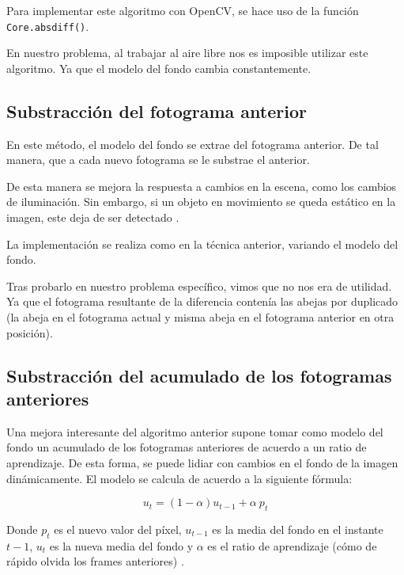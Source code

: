 Para implementar este algoritmo con OpenCV, se hace uso de la función
\texttt{Core.absdiff()}.

En nuestro problema, al trabajar al aire libre nos es imposible utilizar
este algoritmo. Ya que el modelo del fondo cambia constantemente.

\subsection{Substracción del fotograma anterior}\label{substraccion-del-fotograma-anterior}

En este método, el modelo del fondo se extrae del fotograma anterior. De
tal manera, que a cada nuevo fotograma se le substrae el anterior.

De esta manera se mejora la respuesta a cambios en la escena, como los
cambios de iluminación. Sin embargo, si un objeto en movimiento se queda
estático en la imagen, este deja de ser detectado
\citep{book:opencv_java}.

La implementación se realiza como en la técnica anterior, variando el
modelo del fondo.

Tras probarlo en nuestro problema específico, vimos que no nos era de
utilidad. Ya que el fotograma resultante de la diferencia contenía las
abejas por duplicado (la abeja en el fotograma actual y misma abeja en
el fotograma anterior en otra posición).

\subsection{Substracción del acumulado de los fotogramas anteriores}\label{substraccion-del-acumulado-de-los-fotogramas-anteriores}

Una mejora interesante del algoritmo anterior supone tomar como modelo
del fondo un acumulado de los fotogramas anteriores de acuerdo a un
ratio de aprendizaje. De esta forma, se puede lidiar con cambios en el
fondo de la imagen dinámicamente. El modelo se calcula de acuerdo a la
siguiente fórmula:

\begin{equation*}
    u_t = (1-\alpha )u_{t-1}+\alpha\ p_t
\end{equation*}

Donde $p_t$ es el nuevo valor del píxel, $u_{t-1}$ es la media del
fondo en el instante $t-1$, $u_t$ es la nueva media del fondo y
$\alpha$ es el ratio de aprendizaje (cómo de rápido olvida los frames
anteriores) \citep{book:opencv_java}.

